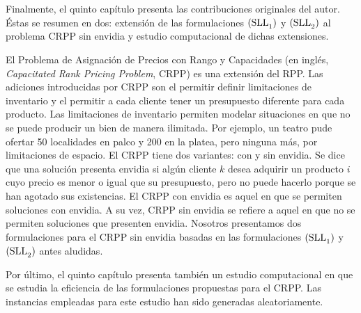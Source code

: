 Finalmente, el quinto capítulo presenta las contribuciones originales del autor.
Éstas se resumen en dos: extensión de las formulaciones $\rm{(SLL}_1\rm{)}$ y
$\rm{(SLL}_2\rm{)}$ al problema CRPP sin envidia y estudio computacional de
dichas extensiones.

El Problema de Asignación de Precios con Rango y Capacidades (en inglés,
\emph{Capacitated Rank Pricing Problem}, CRPP) es una extensión del RPP. Las
adiciones introducidas por CRPP son el permitir definir limitaciones de
inventario y el permitir a cada cliente tener un presupuesto diferente para cada
producto. Las limitaciones de inventario permiten modelar situaciones en que no
se puede producir un bien de manera ilimitada. Por ejemplo, un teatro pude
ofertar 50 localidades en palco y 200 en la platea, pero ninguna más, por
limitaciones de espacio. El CRPP tiene dos variantes: con y sin envidia. Se dice
que una solución presenta envidia si algún cliente $k$ desea adquirir un
producto $i$ cuyo precio es menor o igual que su presupuesto, pero no puede
hacerlo porque se han agotado sus existencias. El CRPP con envidia es aquel en
que se permiten soluciones con envidia. A su vez, CRPP sin envidia se refiere a
aquel en que no se permiten soluciones que presenten envidia. Nosotros
presentamos dos formulaciones para el CRPP sin envidia basadas en las
formulaciones $\rm{(SLL}_1\rm{)}$ y $\rm{(SLL}_2\rm{)}$ antes aludidas.

Por último, el quinto capítulo presenta también un estudio computacional en que
se estudia la eficiencia de las formulaciones propuestas para el CRPP. Las
instancias empleadas para este estudio han sido generadas aleatoriamente.

